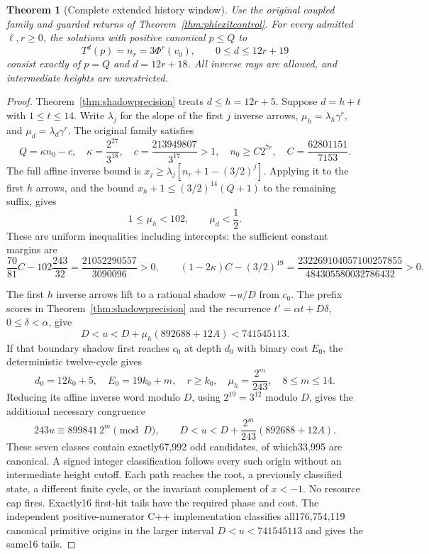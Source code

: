 \documentclass[11pt]{article}
\newtheorem{theorem}{Theorem}
\begin{document}
\begin{theorem}[Complete extended history window]
\label{thm:deeperwindow}
Use the original coupled family and guarded returns of
Theorem~\ref{thm:phiexitcontrol}. For every admitted $\ell,r\ge0$, the
solutions with positive canonical $p\le Q$ to
\[
 T^d(p)=n_r=3\Phi^r(v_0),\qquad 0\le d\le12r+19
\]
consist exactly of $p=Q$ and $d=12r+18$.
All inverse rays are allowed, and intermediate heights are unrestricted.
\end{theorem}
\begin{proof}
Theorem~\ref{thm:shadowprecision} treats $d\le h=12r+5$.
Suppose $d=h+t$ with $1\le t\le14$. Write $\lambda_j$ for the
slope of the first $j$ inverse arrows, $\mu_h=\lambda_h\gamma^r$,
and $\mu_d=\lambda_d\gamma^r$.
The original family satisfies
\[
 Q=\kappa n_0-c,\quad
 \kappa=\frac{2^{27}}{3^{18}},\quad
 c=\frac{213949807}{3^{17}}>1,\quad
 n_0\ge C2^{7r},\quad C=\frac{62801151}{7153}.
\]
The full affine inverse bound is
$x_j\ge\lambda_j[n_r+1-(3/2)^j]$.
Applying it to the first $h$ arrows, and the bound
$x_h+1\le(3/2)^{14}(Q+1)$ to the remaining suffix, gives
\[
 1\le\mu_h<102,\qquad \mu_d<\frac12.
\]
These are uniform inequalities including intercepts: the sufficient
constant margins are
\[
 \frac{70}{81}C-102\frac{243}{32}
   =\frac{21052290557}{3090096}>0,
 \qquad
 (1-2\kappa)C-(3/2)^{19}
   =\frac{232269104057100257855}{484305580032786432}>0.
\]

The first $h$ inverse arrows lift to a rational shadow $-u/D$ from $c_0$.
The prefix scores in Theorem~\ref{thm:shadowprecision} and the recurrence
$t'=\alpha t+D\delta$, $0\le\delta<\alpha$, give
\[
 D<u<D+\mu_h(892688+12A)<741545113.
\]
If that boundary shadow first reaches $c_0$ at depth $d_0$ with binary
cost $E_0$, the deterministic twelve-cycle gives
\[
 d_0=12k_0+5,\quad E_0=19k_0+m,\quad
 r\ge k_0,\quad \mu_h=\frac{2^m}{243},\quad 8\le m\le14.
\]
Reducing its affine inverse word modulo $D$, using $2^{19}=3^{12}$
modulo $D$, gives the additional necessary congruence
\[
 243u\equiv899841\,2^m\pmod D,\qquad
 D<u<D+\frac{2^m}{243}(892688+12A).
\]
These seven classes contain exactly67,992 odd candidates, of which33,995
are canonical. A signed integer classification follows every such origin
without an intermediate height cutoff. Each path reaches the root, a
previously classified state, a different finite cycle, or the invariant
complement of $x<-1$. No resource cap fires. Exactly16 first-hit tails
have the required phase and cost. The independent positive-numerator C++
implementation classifies all176,754,119 canonical primitive origins in
the larger interval $D<u<741545113$ and gives the same16 tails.


\end{proof}
\end{document}
